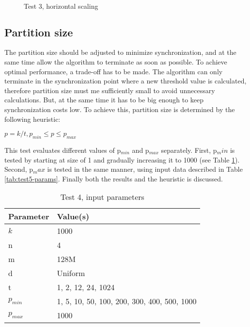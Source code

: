 \begin{figure}[H]
	\centering
	 \qquad
	 \\
	 \qquad
	\caption{Test 3, horizontal scaling}
	\label{fig:test3}
\end{figure}

\subsection{Partition size}
\label{sec:partition-size}

The partition size should be adjusted to minimize synchronization, and
at the same time allow the algorithm to terminate as soon as possible.
To achieve optimal performance, a trade-off has to be made. The
algorithm can only terminate in the synchronization point where a new
threshold value is calculated, therefore partition size must me
sufficiently small to avoid unnecessary calculations. But, at the same
time it has to be big enough to keep synchronization costs low. To
achieve this, partition size is determined by the following heuristic:

$p = k / t,  p_{min} \le p \le p_{max}$

This test evaluates different values of p$_{min}$ and p$_{max}$
separately. First, p${_min}$ is tested by starting at size of 1 and
gradually increasing it to 1000 (see Table \ref{tab:test4-params}).
Second, p${_max}$ is tested in the same manner, using input data
described in Table \ref{tab:test5-params}. Finally both the results
and the heuristic is discussed.

\begin{table}[H]
	\centering
	\begin{tabular}{|l|l|}
	\hline
	Parameter & Value(s) \\ \hline
	$k$ & 1000 \\
	n & 4\\
	m & 128M\\
	d & Uniform\\
	t & 1, 2, 12, 24, 1024\\
	$p_{min}$ & 1, 5, 10, 50, 100, 200, 300, 400, 500, 1000\\
	$p_{max}$ & 1000\\
	\hline
	\end{tabular}
	\caption{Test 4, input parameters}
	\label{tab:test4-params}
\end{table}

